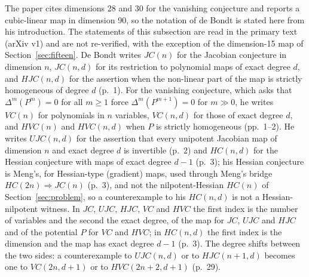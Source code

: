\documentclass[11pt]{article}
\theoremstyle{remark}
\begin{document}
The paper cites dimensions 28 and 30 for the vanishing conjecture and reports a cubic-linear map in dimension 90, so the notation of de Bondt \cite{deBondt2026} is stated here from his introduction. The statements of this subsection are read in the primary text (arXiv v1) and are not re-verified, with the exception of the dimension-15 map of Section~\ref{sec:fifteen}. De Bondt writes $JC(n)$ for the Jacobian conjecture in dimension $n$, $JC(n,d)$ for its restriction to polynomial maps of exact degree $d$, and $HJC(n,d)$ for the assertion when the non-linear part of the map is strictly homogeneous of degree $d$ (p.~1). For the vanishing conjecture, which asks that $\Delta^m(P^m)=0$ for all $m\ge1$ force $\Delta^m(P^{m+1})=0$ for $m\gg0$, he writes $VC(n)$ for polynomials in $n$ variables, $VC(n,d)$ for those of exact degree $d$, and $HVC(n)$ and $HVC(n,d)$ when $P$ is strictly homogeneous (pp.~1--2). He writes $UJC(n,d)$ for the assertion that every unipotent Jacobian map of dimension $n$ and exact degree $d$ is invertible (p.~2) and $HC(n,d)$ for the Hessian conjecture with maps of exact degree $d-1$ (p.~3); his Hessian conjecture is Meng's, for Hessian-type (gradient) maps, used through Meng's bridge $HC(2n)\Rightarrow JC(n)$ (p.~3), and not the nilpotent-Hessian $HC(n)$ of Section~\ref{sec:problem}, so a counterexample to his $HC(n,d)$ is not a Hessian-nilpotent witness. In $JC$, $UJC$, $HJC$, $VC$ and $HVC$ the first index is the number of variables and the second the exact degree, of the map for $JC$, $UJC$ and $HJC$ and of the potential $P$ for $VC$ and $HVC$; in $HC(n,d)$ the first index is the dimension and the map has exact degree $d-1$ (p.~3). The degree shifts between the two sides: a counterexample to $UJC(n,d)$ or to $HJC(n+1,d)$ becomes one to $VC(2n,d+1)$ or to $HVC(2n+2,d+1)$ (p.~29).
\end{document}
